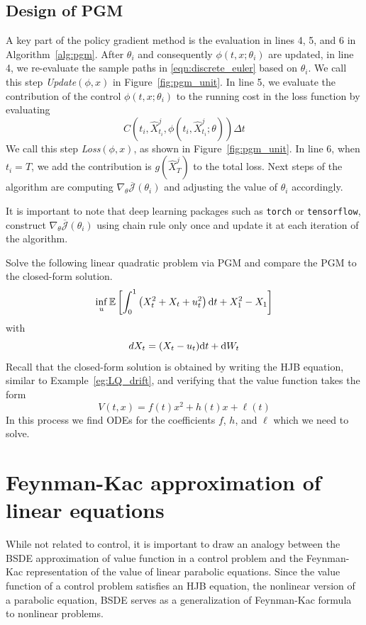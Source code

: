\documentclass[11pt]{book}
\newcommand{\dt}{\text{\normalfont d}t}
\newcommand{\dW}{\text{\normalfont d}W}
\begin{document}
\subsection{Design of PGM}
A key part of the policy gradient method is the evaluation in lines 4, 5, and 6 in Algorithm~\ref{alg:pgm}. After $\theta_i$ and consequently $\phi(t,x;\theta_i)$ are updated, in line 4, we  re-evaluate the sample paths in \eqref{eqn:discrete_euler} based on $\theta_i$. 
We call this step \emph{Update$(\phi,x)$} in Figure~\ref{fig:pgm_unit}. In line 5, we evaluate the contribution of the control $\phi(t,x;\theta_i)$ to the running cost in the loss function by evaluating
\[
C(t_{i},\hat{X}^j_{t_i},\phi(t_{i},\hat{X}^j_{t_{i}};\theta))\Delta t
\]
We call this step \emph{Loss$(\phi,x)$}, as shown in Figure~\ref{fig:pgm_unit}. In line 6, when $t_i=T$, we add the contribution is $g(\hat{X}^j_T)$ to the total loss. Next steps of the algorithm are computing $\nabla_\theta \overline{\mathcal{J}}(\theta_{i})$ and adjusting the value of $\theta_i$ accordingly. 

It is important to note that deep learning packages such as \verb|torch| or \verb|tensorflow|, construct $\nabla_\theta \overline{\mathcal{J}}(\theta_{i})$ using chain rule only once and update it at each iteration of the algorithm. 

\begin{ex}
    Solve the following linear quadratic problem via PGM and compare the PGM to the closed-form solution.
    \[
    \inf_u\mathbb{E}\left[\int_0^1\left(X_t^2+X_t+u_t^2\right)\dt + X_1^2 -X_1\right]
    \]
    with
    \[
    dX_t=(X_t-u_t)\dt+\dW_t
    \]
Recall that the closed-form solution is obtained by writing the HJB equation, similar to Example~\ref{eg:LQ_drift}, and verifying that the value function takes the form 
\[
V(t,x)=f(t)x^2+h(t)x+\ell(t)
\]
In this process we find ODEs for the coefficients $f$, $h$, and $\ell$ which we need to solve.
\end{ex}
\section{Feynman-Kac approximation of linear equations}
\label{sec:F-K_approx}
While not related to control, it is important to draw an analogy between the BSDE approximation of value function in a control problem and the Feynman-Kac representation of the value of linear parabolic equations. Since the value function of a control problem satisfies an HJB equation, the nonlinear version of a parabolic equation, BSDE serves as a generalization of Feynman-Kac formula to nonlinear problems.
\end{document}
